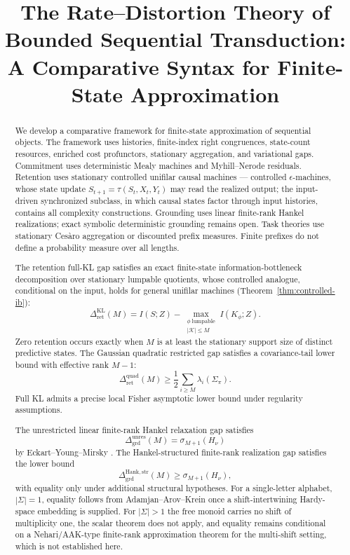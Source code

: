 \documentclass[12pt]{article}
\title{
\bfseries
The Rate--Distortion Theory of Bounded Sequential Transduction:\\
A Comparative Syntax for Finite-State Approximation
}
\author{}
\date{}
\theoremstyle{definition}
\newcommand{\RetKL}{\Delta_{\mathrm{ret}}^{\mathrm{KL}}}
\newcommand{\RetQuad}{\Delta_{\mathrm{ret}}^{\mathrm{quad}}}
\newcommand{\Dunres}{\Delta_{\mathrm{grd}}^{\mathrm{unres}}}
\newcommand{\DHankstr}{\Delta_{\mathrm{grd}}^{\mathrm{Hank,str}}}
\begin{document}
\maketitle

\begin{abstract}
We develop a comparative framework for finite-state approximation of
sequential objects.  The framework uses histories, finite-index right
congruences, state-count resources, enriched cost profunctors, stationary
aggregation, and variational gaps.  Commitment uses deterministic Mealy
machines and Myhill--Nerode residuals.  Retention uses stationary controlled
unifilar causal machines --- controlled $\epsilon$-machines, whose state update
$S_{t+1}=\tau(S_t,X_t,Y_t)$ may read the realized output; the input-driven
synchronized subclass, in which causal states factor through input histories,
contains all complexity constructions.
Grounding uses linear finite-rank Hankel realizations; exact symbolic
deterministic grounding remains open.  Task theories use stationary
Ces\`aro aggregation or discounted prefix measures.  Finite prefixes do not
define a probability measure over all lengths.

The retention full-KL gap satisfies an exact finite-state
information-bottleneck decomposition over stationary lumpable quotients, whose
controlled analogue, conditional on the input, holds for general unifilar
machines (Theorem~\ref{thm:controlled-ib}):
\[
\RetKL(M)
=
I(S;Z)
-
\max_{\substack{
\phi\ \text{lumpable}\\
|\mathcal K|\le M
}}
I(K_\phi;Z).
\]
Zero retention occurs exactly when $M$ is at least the stationary support size
of distinct predictive states.  The Gaussian quadratic restricted gap
satisfies a covariance-tail lower bound with effective rank $M-1$:
\[
\RetQuad(M)
\ge
\frac12
\sum_{i\ge M}
\lambda_i(\Sigma_\pi).
\]
Full KL admits a precise local Fisher asymptotic lower bound under regularity
assumptions.

The unrestricted linear finite-rank Hankel relaxation gap satisfies
\[
\Dunres(M)
=
\sigma_{M+1}(H_\nu)
\]
by Eckart--Young--Mirsky \cite{eckart1936,mirsky1960}.  The Hankel-structured finite-rank realization gap
satisfies the lower bound
\[
\DHankstr(M)
\ge
\sigma_{M+1}(H_\nu),
\]
with equality only under additional structural hypotheses.  For a single-letter
alphabet, $|\Sigma|=1$, equality follows from Adamjan--Arov--Krein once a
shift-intertwining Hardy-space embedding is supplied.  For $|\Sigma|>1$ the
free monoid carries no shift of multiplicity one, the scalar theorem does not
apply, and equality remains conditional on a Nehari/AAK-type finite-rank
approximation theorem for the multi-shift setting, which is not established
here.


\end{abstract}
\end{document}
